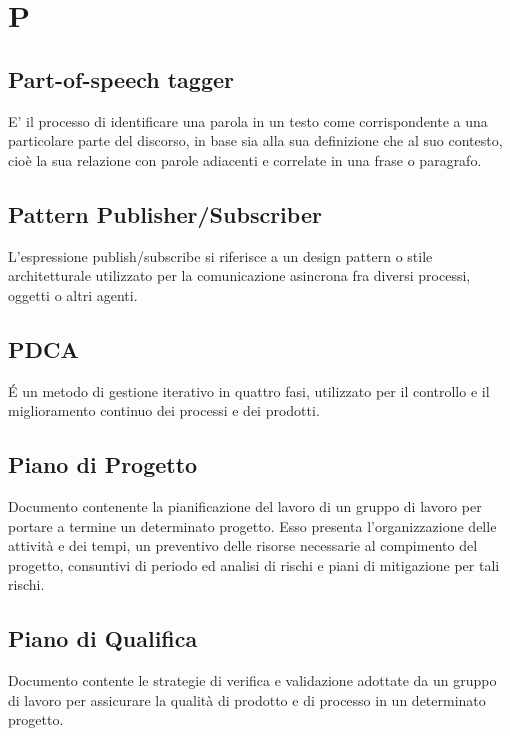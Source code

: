 \section*{P}

\subsection{Part-of-speech tagger}
E' il processo di identificare una parola in un testo come corrispondente a una particolare parte del discorso, in base sia alla sua definizione che al suo contesto, cioè la sua relazione con parole adiacenti e correlate in una frase o paragrafo.

\subsection{Pattern Publisher/Subscriber} 
L'espressione publish/subscribe si riferisce a un design pattern o stile architetturale utilizzato per la comunicazione asincrona fra diversi processi, oggetti o altri agenti.

\subsection{PDCA}
\'E un metodo di gestione iterativo in quattro fasi, utilizzato per il controllo e il miglioramento continuo dei processi e dei prodotti.
 
\subsection{Piano di Progetto}
Documento contenente la pianificazione del lavoro di un gruppo di lavoro per portare a termine un determinato progetto. Esso presenta l'organizzazione delle attività e dei tempi, un preventivo delle risorse necessarie al compimento del progetto, consuntivi di periodo ed analisi di rischi e piani di mitigazione per tali rischi.

\subsection{Piano di Qualifica}
Documento contente le strategie di verifica e validazione adottate da un gruppo di lavoro per assicurare la qualità di prodotto e di processo in un determinato progetto.

